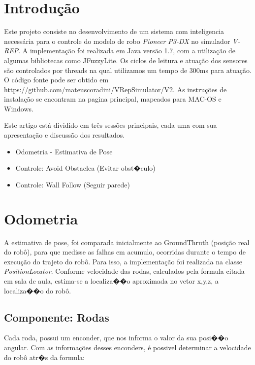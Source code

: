 \documentclass[twoside,conference,a4paper]{IEEEtran}
\begin{document}

\section{Introdução}

Este projeto consiste no desenvolvimento de um sistema com inteligencia necessária para o controle do modelo de robo \textit{Pioneer P3-DX} no simulador \textit{V-REP}. A implementação foi realizada em Java versão 1.7, com a utilização de algumas bibliotecas como JFuzzyLite. Os ciclos de leitura e atuação dos sensores são controlados por threads na qual utilizamos um tempo de 300ms para atuação. O código fonte pode ser obtido em https://github.com/mateuscoradini/VRepSimulator/V2. As instruções de instalação se encontram na pagina principal, mapeados para MAC-OS e Windows. 

Este artigo está dividido em três sessões principais, cada uma com sua apresentação e discussão dos resultados.

\begin{itemize}
 \item Odometria - Estimativa de Pose
 \item Controle: Avoid Obstaclea (Evitar obst�culo)
 \item Controle: Wall Follow (Seguir parede)
\end{itemize}


\section{Odometria}
A estimativa de pose, foi comparada inicialmente ao GroundThruth (posição real do robô), para que medisse as falhas em acumulo, ocorridas durante o tempo de execução do trajeto do robô.
Para isso, a implementação foi realizada na classe \textit{PositionLocator}. Conforme velocidade das rodas, calculados pela formula citada em sala de aula, estima-se a localiza��o aproximada no vetor x,y,z, a localiza��o do robô.

\subsection{Componente: Rodas }
 Cada roda, possui um enconder, que nos informa o valor da sua posi��o angular. Com as informações desses enconders, é possivel determinar a velocidade do robô atr�s da formula:
 
\end{document}
